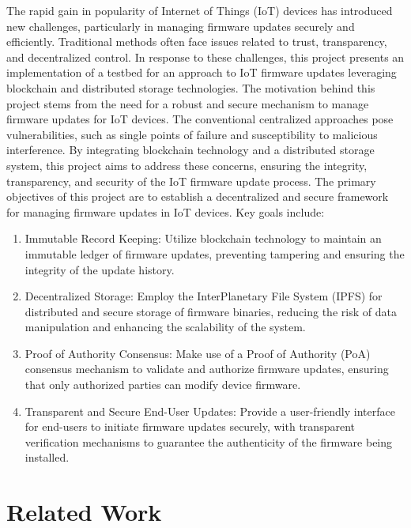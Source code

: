 \documentclass{article}
\begin{document}
The rapid gain in popularity of Internet of Things (IoT) devices has introduced new challenges, particularly in managing firmware updates securely and efficiently. Traditional methods often face issues related to trust, transparency, and decentralized control. In response to these challenges, this project presents an implementation of a testbed for an approach to IoT firmware updates leveraging blockchain and distributed storage technologies.
The motivation behind this project stems from the need for a robust and secure mechanism to manage firmware updates for IoT devices. The conventional centralized approaches pose vulnerabilities, such as single points of failure and susceptibility to malicious interference. By integrating blockchain technology and a distributed storage system, this project aims to address these concerns, ensuring the integrity, transparency, and security of the IoT firmware update process.
The primary objectives of this project are to establish a decentralized and secure framework for managing firmware updates in IoT devices. Key goals include:
\begin{enumerate}
    \item Immutable Record Keeping: Utilize blockchain technology to maintain an immutable ledger of firmware updates, preventing tampering and ensuring the integrity of the update history.
    
    \item Decentralized Storage: Employ the InterPlanetary File System (IPFS) for distributed and secure storage of firmware binaries, reducing the risk of data manipulation and enhancing the scalability of the system.
    
    \item Proof of Authority Consensus: Make use of a Proof of Authority (PoA) consensus mechanism to validate and authorize firmware updates, ensuring that only authorized parties can modify device firmware.
    
    \item Transparent and Secure End-User Updates: Provide a user-friendly interface for end-users to initiate firmware updates securely, with transparent verification mechanisms to guarantee the authenticity of the firmware being installed.
\end{enumerate}

\section{Related Work}
\label{sec:Related Work}
\end{document}
